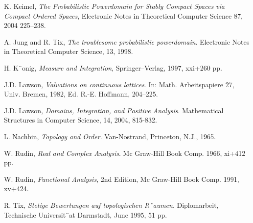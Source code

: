 \documentclass[12pt,a4paper]{article}
\theoremstyle{definition}
\theoremstyle{theorem}
\theoremstyle{definition}
\begin{document}
\begin{thebibliography}{99}
K. Keimel, {\em The Probabilistic Powerdomain for Stably Compact Spaces via Compact Ordered Spaces}, Electronic Notes in Theoretical Computer Science 87, 2004 225–238.

A. Jung and R. Tix,  {\em The troublesome probabilistic powerdomain}. Electronic Notes in
Theoretical Computer Science, 13, 1998.

H. K¨onig,  {\em Measure and Integration}, Springer–Verlag, 1997, xxi+260 pp.

J.D. Lawson, {\em Valuations on continuous lattices}. In: Math. Arbeitspapiere 27, Univ. Bremen,
1982, Ed. R.-E. Hoffmann, 204–225.

J.D. Lawson, {\em Domains, Integration, and Positive Analysis}. Mathematical Structures in
Computer Science, 14, 2004, 815-832.

L. Nachbin, {\em Topology and Order}. Van-Nostrand, Princeton, N.J., 1965.

W. Rudin,  {\em Real and Complex Analysis}.  Mc Graw-Hill Book Comp. 1966, xi+412 pp.

W. Rudin,  {\em Functional Analysis},  2nd Edition, Mc Graw-Hill Book Comp.  1991,  xv+424.

R. Tix,  {\em Stetige Bewertungen auf topologischen R¨aumen}. Diplomarbeit, Technische Universit¨at
Darmstadt, June 1995, 51 pp.

\end{thebibliography}

\printindex
\end{document}
